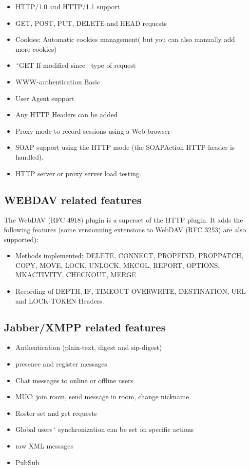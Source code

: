 \documentclass{TSUNG-en}
\begin{document}
\begin{itemize}
\item HTTP/1.0 and HTTP/1.1 support
\item GET, POST, PUT, DELETE and HEAD requests
\item Cookies: Automatic cookies management( but you can also manually
  add more cookies)
\item \verb|'|GET If-modified since\verb|'| type of request
\item WWW-authentication Basic
\item User Agent support
\item Any HTTP Headers can be added
\item Proxy mode to record sessions using a Web browser
\item SOAP support using the HTTP mode (the SOAPAction HTTP header is
  handled).
\item HTTP server or proxy server load testing.
\end{itemize}

\subsection{WEBDAV related features}

The WebDAV (RFC 4918) plugin is a superset of the HTTP plugin. It adds the
following features (some versionning extensions to WebDAV (RFC 3253)
are also supported):

\begin{itemize}
\item Methods implemented: DELETE, CONNECT, PROPFIND, PROPPATCH, COPY,
  MOVE, LOCK, UNLOCK, MKCOL, REPORT, OPTIONS, MKACTIVITY, CHECKOUT, MERGE
\item Recording of DEPTH, IF, TIMEOUT OVERWRITE, DESTINATION, URL and
  LOCK-TOKEN Headers.
\end{itemize}

\subsection{Jabber/XMPP related features}

\begin{itemize}
\item Authentication (plain-text, digest and sip-digest)
\item presence and register messages
\item Chat messages to online or offline users
\item MUC: join room, send message in room, change nickname
\item Roster set and get requests
\item Global users\verb|'| synchronization can be set on specific actions
\item raw XML messages
\item PubSub
\end{itemize}
\end{document}
